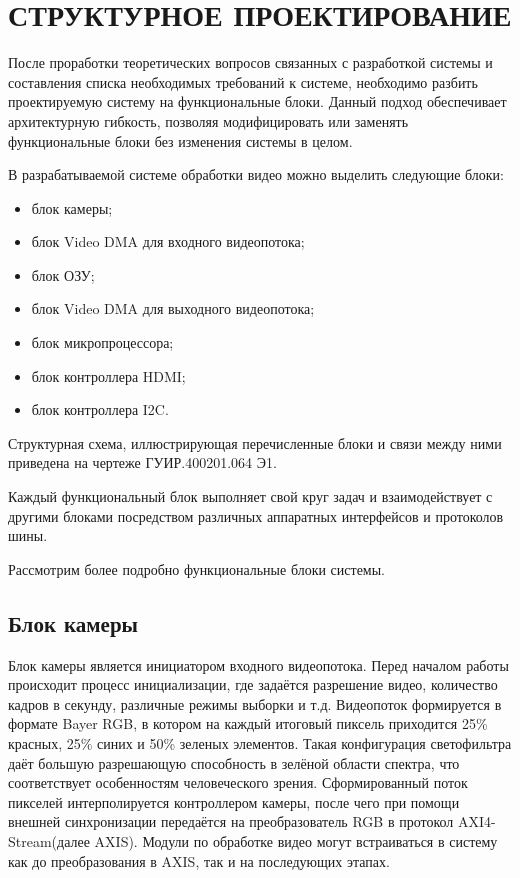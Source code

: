\section{СТРУКТУРНОЕ ПРОЕКТИРОВАНИЕ}
\label{sec:structural}

После проработки теоретических вопросов связанных с разработкой системы и
составления списка необходимых требований к системе, необходимо разбить проектируемую систему
на функциональные блоки. Данный подход обеспечивает архитектурную гибкость, позволяя
модифицировать или заменять функциональные блоки без изменения системы в целом.

В разрабатываемой системе обработки видео можно выделить следующие блоки:

\begin{itemize}
  \item блок камеры;
  \item блок Video DMA для входного видеопотока;
  \item блок ОЗУ;
  \item блок Video DMA для выходного видеопотока;
  \item блок микропроцессора;
  \item блок контроллера HDMI;
  \item блок контроллера I2C.
\end{itemize}

Структурная схема, иллюстрирующая перечисленные блоки и связи
между ними приведена на чертеже ГУИР.400201.064 Э1.

Каждый функциональный блок выполняет свой круг задач и взаимодействует с другими блоками
посредством различных аппаратных интерфейсов и протоколов шины.

Рассмотрим более подробно функциональные блоки системы.

\subsection{Блок камеры}
\label{sec:structural:camera}

Блок камеры является инициатором входного видеопотока. Перед началом работы происходит
процесс инициализации, где задаётся разрешение видео, количество кадров в секунду,
различные режимы выборки и т.д. Видеопоток формируется в формате Bayer RGB, в котором
на каждый итоговый пиксель приходится 25\% красных, 25\% синих и 50\% зеленых элементов.
Такая конфигурация светофильтра даёт большую разрешающую способность в зелёной области спектра,
что соответствует особенностям человеческого зрения. Сформированный поток пикселей интерполируется
контроллером камеры, после чего при помощи внешней синхронизации передаётся на преобразователь
RGB в протокол AXI4-Stream(далее AXIS). Модули по обработке видео могут встраиваться в систему как до преобразования в
AXIS, так и на последующих этапах.

